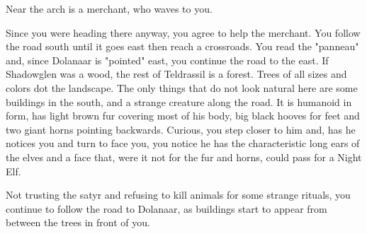 Near the arch is a merchant, who waves to you.


Since you were heading there anyway, you agree to help the merchant. You follow the road south until it goes east then reach a crossroads. You read the "panneau" and, since Dolanaar is "pointed" east, you continue the road to the east. If Shadowglen was a wood, the rest of Teldrassil is a forest. Trees of all sizes and colors dot the landscape. The only things that do not look natural here are some buildings in the south, and a strange creature along the road. It is humanoid in form, has light brown fur covering most of his body, big black hooves for feet and two giant horns pointing backwards. Curious, you step closer to him and, has he notices you and turn to face you, you notice he has the characteristic long ears of the elves and a face that, were it not for the fur and horns, could pass for a Night Elf.




Not trusting the satyr and refusing to kill animals for some strange rituals, you continue to follow the road to Dolanaar, as buildings start to appear from between the trees in front of you.

